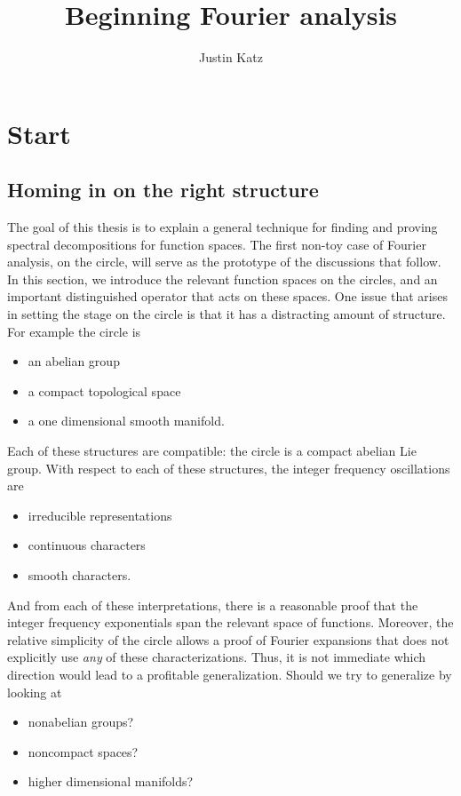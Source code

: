 \documentclass[12pt]{amsart}
\title{Beginning Fourier analysis}
\author{Justin Katz}
\begin{document}
\maketitle
\section{Start}
\subsection{Homing in on the right structure}
	The goal of this thesis is to explain a general technique for finding and proving spectral decompositions for function spaces. The first non-toy case of Fourier analysis, on the circle, will serve as the prototype of the discussions that follow. In this section, we introduce the relevant function spaces on the circles, and an important distinguished operator that acts on these spaces. One issue that arises in setting the stage on the circle is that it has a distracting amount of structure. For example the circle is
	\begin{itemize}
		\item an abelian group
		\item a compact topological space
		\item a one dimensional smooth manifold.
	\end{itemize}
Each of these structures are compatible: the circle is a compact abelian Lie group. With respect to each of these structures, the integer frequency oscillations are
	\begin{itemize}
		\item irreducible representations
		\item continuous characters
		\item smooth characters.
	\end{itemize}
		And from each of these interpretations, there is a reasonable proof that the integer frequency exponentials span the relevant space of functions.  Moreover, the relative simplicity of the circle allows a proof of Fourier expansions that does not explicitly use \emph{any} of these characterizations. Thus, it is not immediate which direction would lead to a profitable generalization. Should we try to generalize by looking at 
		\begin{itemize}
			\item nonabelian groups?
			\item noncompact spaces?
			\item higher dimensional manifolds?
		\end{itemize}
\end{document}
